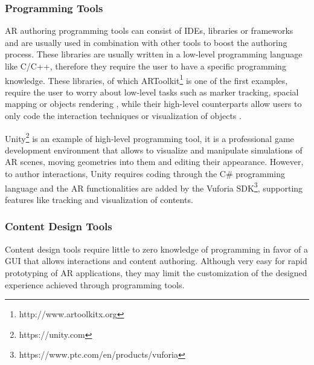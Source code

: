\subsubsection{Programming Tools}
\label{subsec:related-programming-tools}
AR authoring programming tools can consist of IDEs, libraries or frameworks and are usually used in combination with other tools to boost the authoring process.
These libraries are usually written in a low-level programming language like C/C++, therefore they require the user to have a specific programming knowledge. These libraries, of which ARToolkit\footnote{http://www.artoolkitx.org} \cite{kato1999marker} is one of the first examples, require the user to worry about low-level tasks such as marker tracking, spacial mapping or objects rendering \cite{stephanidis_authoring_2020},  while their high-level counterparts allow users to only code the interaction techniques or visualization of objects \cite{stephanidis_authoring_2020}.

Unity\footnote{https://unity.com} is an example of high-level programming tool, it is a professional game development environment that allows to visualize and manipulate simulations of AR scenes, moving geometries into them and editing their appearance. However, to author interactions, Unity requires coding through the C\# programming language and the AR functionalities are added by the Vuforia SDK\footnote{https://www.ptc.com/en/products/vuforia}, supporting features like tracking and visualization of contents.

\subsubsection{Content Design Tools}
\label{subsec:related-content-design-tools}
Content design tools require little to zero knowledge of programming in favor of a GUI that allows interactions and content authoring. Although very easy for rapid prototyping of AR applications, they may limit the customization of the designed experience achieved through programming tools.

